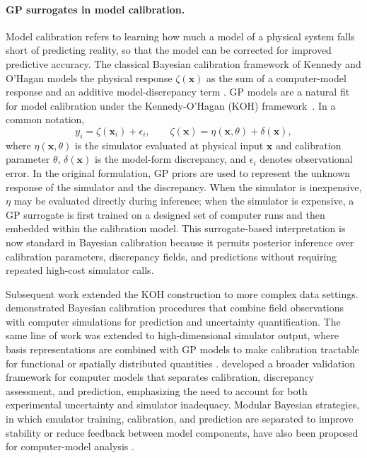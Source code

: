 \documentclass[a4paper,12pt]{article}
\newcommand{\x}{\mathbf{x}}
\begin{document}
\paragraph{GP surrogates in model calibration.}
Model calibration refers to learning how much a model of a physical system falls short of predicting reality, so that the model can be corrected for improved predictive accuracy. 
The classical Bayesian calibration framework of Kennedy and O'Hagan models the physical response $\zeta(\x)$ as the sum of a computer-model response and an additive model-discrepancy term \cite{kennedy2001bayesian}. GP models are a natural fit for model calibration under the Kennedy-O'Hagan (KOH) framework~\cite{kennedy2001bayesian,higdon2004combining,higdon2008computer}.
In a common notation,
\begin{equation}
    y_i = \zeta(\x_i) + \epsilon_i, 
    \qquad
    \zeta(\x) = \eta(\x,\theta) + \delta(\x),
    \label{eq:koh_review}
\end{equation}
where $\eta(\x,\theta)$ is the simulator evaluated at physical input $\x$ and calibration parameter $\theta$, $\delta(\x)$ is the model-form discrepancy, and $\epsilon_i$ denotes observational error. In the original formulation, GP priors are used to represent the unknown response of the simulator and the discrepancy. When the simulator is inexpensive, $\eta$ may be evaluated directly during inference; when the simulator is expensive, a GP surrogate is first trained on a designed set of computer runs and then embedded within the calibration model. This surrogate-based interpretation is now standard in Bayesian calibration because it permits posterior inference over calibration parameters, discrepancy fields, and predictions without requiring repeated high-cost simulator calls.

Subsequent work extended the KOH construction to more complex data settings. \citet{higdon2004combining} demonstrated Bayesian calibration procedures that combine field observations with computer simulations for prediction and uncertainty quantification. The same line of work was extended to high-dimensional simulator output, where basis representations are combined with GP models to make calibration tractable for functional or spatially distributed quantities \cite{higdon2008computer}. \citet{bayarri2007framework} developed a broader validation framework for computer models that separates calibration, discrepancy assessment, and prediction, emphasizing the need to account for both experimental uncertainty and simulator inadequacy. Modular Bayesian strategies, in which emulator training, calibration, and prediction are separated to improve stability or reduce feedback between model components, have also been proposed for computer-model analysis \cite{liu2009modularization}.
\end{document}
